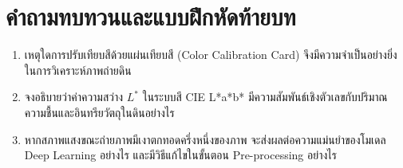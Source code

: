 \section{คำถามทบทวนและแบบฝึกหัดท้ายบท}
\begin{enumerate}
    \item เหตุใดการปรับเทียบสีด้วยแผ่นเทียบสี (Color Calibration Card) จึงมีความจำเป็นอย่างยิ่งในการวิเคราะห์ภาพถ่ายดิน
    \item จงอธิบายว่าค่าความสว่าง $L^*$ ในระบบสี CIE L*a*b* มีความสัมพันธ์เชิงตัวเลขกับปริมาณความชื้นและอินทรียวัตถุในดินอย่างไร
    \item หากสภาพแสงขณะถ่ายภาพมีเงาตกทอดครึ่งหนึ่งของภาพ จะส่งผลต่อความแม่นยำของโมเดล Deep Learning อย่างไร และมีวิธีแก้ไขในขั้นตอน Pre-processing อย่างไร
\end{enumerate}
